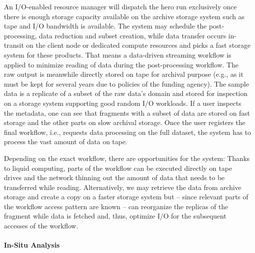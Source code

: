 \documentclass[a4paper, twocolumn]{article}
\begin{document}
An I/O-enabled resource manager will dispatch the hero run exclusively once there is enough storage capacity available on the archive storage system such as tape and I/O bandwidth is available.
The system may schedule the post-processing, data reduction and subset creation, while  data transfer occurs in-transit on the client node or dedicated compute resources and picks a fast storage system for these products.
That means a data-driven streaming workflow is applied to minimize reading of data during the post-processing workflow.
The raw output is meanwhile directly stored on tape for archival purpose (e.g., as it must be kept for several years due to policies of the funding agency).
The sample data is a replicate of a subset of the raw data's domain and stored for inspection on a storage system supporting good random I/O workloads.
If a user inspects the metadata, one can see that fragments with a subset of data are stored on fast storage and the other parts on slow archival storage.
Once the user registers the final workflow, i.e., requests data processing on the full dataset, the system has to process the vast amount of data on tape.

Depending on the exact workflow, there are opportunities for the system:
Thanks to liquid computing, parts of the workflow can be executed directly on tape drives and the network thinning out the amount of data that needs to be transferred while reading.
Alternatively, we may retrieve the data from archive storage and create a copy on a faster storage system but -- since relevant parts of the workflow access pattern are known -- can reorganize the replicas of the fragment while data is fetched and, thus, optimize I/O for the subsequent accesses of the workflow.


\paragraph{In-Situ Analysis}
\end{document}
